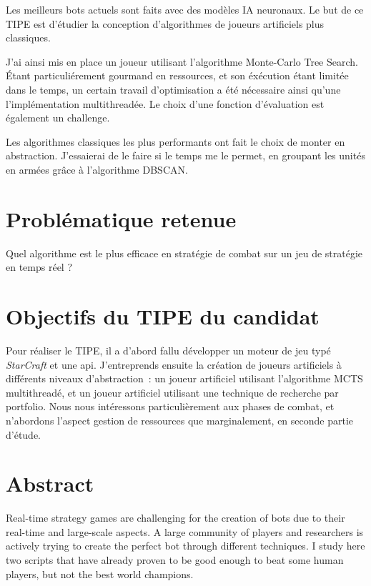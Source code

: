 \documentclass[a4paper, 12pt]{article}
\begin{document}
Les meilleurs bots actuels sont faits avec des modèles IA neuronaux.
Le but de ce TIPE est d'étudier la conception d'algorithmes de joueurs artificiels plus classiques.

J'ai ainsi mis en place un joueur utilisant l'algorithme Monte-Carlo Tree Search.
Étant particuliérement gourmand en ressources, et son éxécution étant limitée dans le temps,
un certain travail d'optimisation a été nécessaire ainsi qu'une l'implémentation multithreadée.
Le choix d'une fonction d'évaluation est également un challenge.\cite{MCTSRTS}\cite{MCTStactical}

Les algorithmes classiques les plus performants ont fait le choix de monter en abstraction.
J'essaierai de le faire si le temps me le permet, en groupant les unités en armées grâce à l'algorithme DBSCAN.
\cite{dbscan}\cite{combatmodel}


\section*{Problématique retenue}
Quel algorithme est le plus efficace en stratégie de combat sur un jeu de stratégie en temps réel ?

\section*{Objectifs du TIPE du candidat}
Pour réaliser le TIPE, il a d'abord fallu développer un moteur de jeu typé \emph{StarCraft} et une api.
J'entreprends ensuite la création de joueurs artificiels à différents niveaux d'abstraction :
un joueur artificiel utilisant l'algorithme MCTS multithreadé, et un joueur artificiel utilisant une technique de recherche par portfolio.
Nous nous intéressons particulièrement aux phases de combat, et n'abordons l'aspect gestion de ressources que marginalement, en seconde partie d'étude.

\section*{Abstract}

Real-time strategy games are challenging for the creation of bots due to their real-time and large-scale aspects.
A large community of players and researchers is actively trying to create the perfect bot through different techniques.
I study here two scripts that have already proven to be good enough to beat some human players, but not the best world champions.



\end{document}

